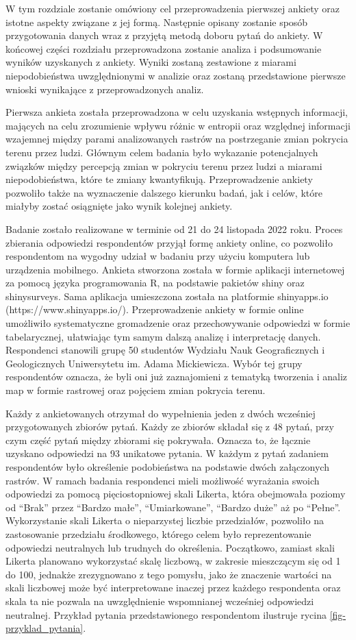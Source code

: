 \documentclass{amuthesis}
\begin{document}
W tym rozdziale zostanie omówiony cel przeprowadzenia pierwszej ankiety
oraz istotne aspekty związane z jej formą. Następnie opisany zostanie
sposób przygotowania danych wraz z przyjętą metodą doboru pytań do
ankiety. W końcowej części rozdziału przeprowadzona zostanie analiza i
podsumowanie wyników uzyskanych z ankiety. Wyniki zostaną zestawione z
miarami niepodobieństwa uwzględnionymi w analizie oraz zostaną
przedstawione pierwsze wnioski wynikające z przeprowadzonych analiz.

Pierwsza ankieta została przeprowadzona w celu uzyskania wstępnych
informacji, mających na celu zrozumienie wpływu różnic w entropii oraz
względnej informacji wzajemnej między parami analizowanych rastrów na
postrzeganie zmian pokrycia terenu przez ludzi. Głównym celem badania
było wykazanie potencjalnych związków między percepcją zmian w pokryciu
terenu przez ludzi a miarami niepodobieństwa, które te zmiany
kwantyfikują. Przeprowadzenie ankiety pozwoliło także na wyznaczenie
dalszego kierunku badań, jak i celów, które miałyby zostać osiągnięte
jako wynik kolejnej ankiety.

Badanie zostało realizowane w terminie od 21 do 24 listopada 2022 roku.
Proces zbierania odpowiedzi respondentów przyjął formę ankiety online,
co pozwoliło respondentom na wygodny udział w badaniu przy użyciu
komputera lub urządzenia mobilnego. Ankieta stworzona została w formie
aplikacji internetowej za pomocą języka programowania R, na podstawie
pakietów shiny oraz shinysurveys. Sama aplikacja umieszczona została na
platformie shinyapps.io (https://www.shinyapps.io/). Przeprowadzenie
ankiety w formie online umożliwiło systematyczne gromadzenie oraz
przechowywanie odpowiedzi w formie tabelarycznej, ułatwiając tym samym
dalszą analizę i interpretację danych. Respondenci stanowili grupę 50
studentów Wydziału Nauk Geograficznych i Geologicznych Uniwersytetu im.
Adama Mickiewicza. Wybór tej grupy respondentów oznacza, że byli oni już
zaznajomieni z tematyką tworzenia i analiz map w formie rastrowej oraz
pojęciem zmian pokrycia terenu.

Każdy z ankietowanych otrzymał do wypełnienia jeden z dwóch wcześniej
przygotowanych zbiorów pytań. Każdy ze zbiorów składał się z 48 pytań,
przy czym część pytań między zbiorami się pokrywała. Oznacza to, że
łącznie uzyskano odpowiedzi na 93 unikatowe pytania. W każdym z pytań
zadaniem respondentów było określenie podobieństwa na podstawie dwóch
załączonych rastrów. W ramach badania respondenci mieli możliwość
wyrażania swoich odpowiedzi za pomocą pięciostopniowej skali Likerta,
która obejmowała poziomy od ``Brak'' przez ``Bardzo małe'',
``Umiarkowane'', ``Bardzo duże'' aż po ``Pełne''. Wykorzystanie skali
Likerta o nieparzystej liczbie przedziałów, pozwoliło na zastosowanie
przedziału środkowego, którego celem było reprezentowanie odpowiedzi
neutralnych lub trudnych do określenia. Początkowo, zamiast skali
Likerta planowano wykorzystać skalę liczbową, w zakresie mieszczącym się
od 1 do 100, jednakże zrezygnowano z tego pomysłu, jako że znaczenie
wartości na skali liczbowej może być interpretowane inaczej przez
każdego respondenta oraz skala ta nie pozwala na uwzględnienie
wspomnianej wcześniej odpowiedzi neutralnej. Przykład pytania
przedstawionego respondentom ilustruje rycina
\ref{fig-przyklad_pytania}.
\end{document}
